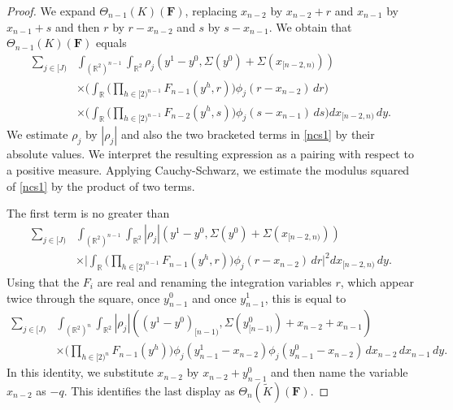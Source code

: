 \documentclass[12pt,reqno]{amsart}
\theoremstyle{plain}
\numberwithin{equation}{section}
\theoremstyle{remark}
\newcommand{\R}{{\mathbb R}}
\newcommand{\F}{\mathbf{F}}
\begin{document}
\begin{proof}
We expand $\Theta_{n-1}(K)(\F)$, replacing $x_{n-2}$ by $x_{n-2}+r$ and $x_{n-1}$ by $x_{n-1}+s$
and then $r$ by $r-x_{n-2}$ and $s$ by $s-x_{n-1}$. We obtain that $\Theta_{n-1}(K)(\F)$ equals
\begin{equation}\label{ncs1}
\begin{aligned}
\sum_{j\in[J)} & \int_{(\R^2)^{n-1}} \int_{\R^2}
\rho_j(y^1-y^0, \Sigma(y^0)+\Sigma(x_{[n-2,n)}))
\\
&\times \Big( \int_{\R} \Big(\prod_{h\in [2)^{n-1}} F_{n-1}(y^h,r)\Big)
\phi_j(r-x_{n-2})\,dr\Big)
\\
&\times \Big( \int_{\R} \Big(\prod_{h\in [2)^{n-1}} F_{n-2}(y^h,s)\Big)
\phi_j(s-x_{n-1})\,ds\Big)
    dx_{[n-2,n)}\,dy .
\end{aligned}
\end{equation}
We estimate $\rho_j$ by $|\rho_j|$ and also the two bracketed terms in \eqref{ncs1} by their absolute values.
We interpret the resulting expression as a pairing with respect to a positive measure.
Applying Cauchy-Schwarz, we estimate the modulus squared of \eqref{ncs1} by the product of two terms.

The first term is no greater than
\begin{equation}
\begin{aligned}
\sum_{j\in[J)} & \int_{(\R^2)^{n-1}} \int_{\R^2}
|\rho_j|(y^1-y^0, \Sigma(y^0)+\Sigma(x_{[n-2,n)}))
\\
&\times
\Big|
 \int_{\R} \Big(\prod_{h\in [2)^{n-1}} F_{n-1}(y^h,r)\Big)
\phi_j(r-x_{n-2})\,dr
\Big|^2
    dx_{[n-2,n)}\,dy .
\end{aligned}
\end{equation}
Using that the $F_i$ are real and renaming the integration variables $r$, which appear twice
through the square, once $y_{n-1}^0$ and once $y_{n-1}^1$, this is equal to
\begin{equation}
\begin{aligned}
\sum_{j\in[J)} & \int_{(\R^2)^n}\int_{\R^2}
|\rho_j|((y^1-y^0)_{[n-1)},\Sigma(y^0_{[n-1)})+x_{n-2}+x_{n-1})
\\
&\times
\Big(\prod_{h\in[2)^n}F_{n-1}(y^h)\Big)
\phi_j(y_{n-1}^1-x_{n-2})\phi_j(y_{n-1}^0-x_{n-2})
\,dx_{n-2}\,dx_{n-1}\,dy .
\end{aligned}
\end{equation}
In this identity, we substitute $x_{n-2}$ by $x_{n-2}+y_{n-1}^0$ and then name the variable $x_{n-2}$ as $-q$.
This identifies the last display as $\Theta_n(\tilde K)(\F)$.


\end{proof}
\end{document}
